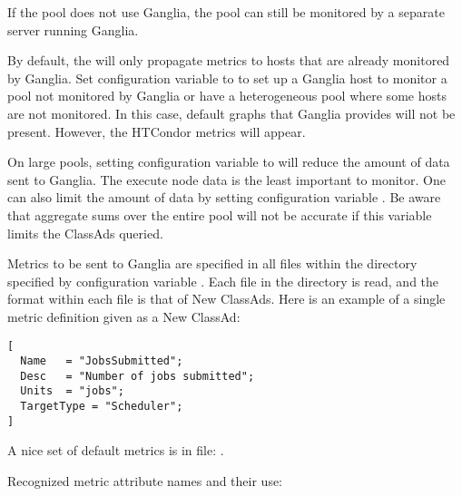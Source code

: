 If the pool does not use Ganglia, 
the pool can still be monitored by a separate server running Ganglia.

By default, the  will only propagate metrics to hosts
that are already monitored by Ganglia.
Set configuration variable  
to  to set up
a Ganglia host to monitor a pool not monitored by Ganglia
or have a heterogeneous pool where some hosts are not monitored.
In this case, default graphs that Ganglia provides will not be present.
However, the HTCondor metrics will appear.

On large pools, 
setting configuration variable 
to  will reduce the amount of data sent to Ganglia.
The execute node data is the least important to monitor.
One can also limit the amount of data by setting configuration variable
.
Be aware that aggregate sums over the entire pool will not be accurate
if this variable limits the ClassAds queried.

Metrics to be sent to Ganglia are specified in all files within the
directory specified by configuration variable 
.
Each file in the directory is read,
and the format within each file is that of New ClassAds.
Here is an example of a single metric definition given as a New ClassAd:

\begin{verbatim}
[
  Name   = "JobsSubmitted";
  Desc   = "Number of jobs submitted";
  Units  = "jobs";
  TargetType = "Scheduler";
]
\end{verbatim}

A nice set of default metrics is in file:
.

Recognized metric attribute names and their use:

